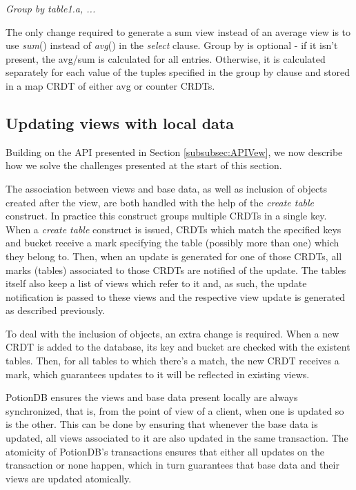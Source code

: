 \documentclass{vldb}
\newcommand{\emphvspace}{0.5\baselineskip}
\newcommand{\lastblockemph}[1]{\hspace{2em}\emph{#1}\vspace{\emphvspace}}
\begin{document}
\lastblockemph{Group by table1.a, ...}

The only change required to generate a sum view instead of an average view is to use \emph{sum}() instead of \emph{avg}() in the \emph{select} clause.
Group by is optional - if it isn't present, the avg/sum is calculated for all entries. Otherwise, it is calculated separately for each value of the tuples specified in the group by clause and stored in a map CRDT of either avg or counter CRDTs.

\subsection{Updating views with local data}

Building on the API presented in Section \ref{subsubsec:APIVew}, we now describe how we solve the challenges presented at the start of this section.

The association between views and base data, as well as inclusion of objects created after the view, are both handled with the help of the \emph{create table} construct.
In practice this construct groups multiple CRDTs in a single key.
When a \emph{create table} construct is issued, CRDTs which match the specified keys and bucket receive a mark specifying the table (possibly more than one) which they belong to.
Then, when an update is generated for one of those CRDTs, all marks (tables) associated to those CRDTs are notified of the update.
The tables itself also keep a list of views which refer to it and, as such, the update notification is passed to these views and the respective view update is generated as described previously.

To deal with the inclusion of objects, an extra change is required.
When a new CRDT is added to the database, its key and bucket are checked with the existent tables.
Then, for all tables to which there's a match, the new CRDT receives a mark, which guarantees updates to it will be reflected in existing views.

PotionDB ensures the views and base data present locally are always synchronized, that is, from the point of view of a client, when one is updated so is the other.
This can be done by ensuring that whenever the base data is updated, all views associated to it are also updated in the same transaction.
The atomicity of PotionDB's transactions ensures that either all updates on the transaction or none happen, which in turn guarantees that base data and their views are updated atomically.
\end{document}
